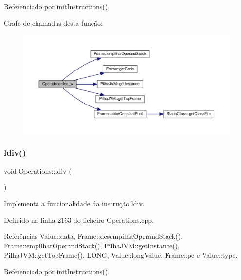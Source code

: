 Referenciado por init\+Instructions().

Grafo de chamadas desta função\+:
\nopagebreak
\begin{figure}[H]
\begin{center}
\leavevmode
\includegraphics[width=350pt]{classOperations_a081fd22827f77e8ce5219275256cc831_cgraph}
\end{center}
\end{figure}
\mbox{\label{classOperations_ab9bb90a9db0433e1d04b0eb9bceea9f4}} 
\subsubsection{\texorpdfstring{ldiv()}{ldiv()}}
{\footnotesize\ttfamily void Operations\+::ldiv (\begin{DoxyParamCaption}{ }\end{DoxyParamCaption})\hspace{0.3cm}{\ttfamily [private]}}



Implementa a funcionalidade da instrução ldiv. 



Definido na linha 2163 do ficheiro Operations.\+cpp.



Referências Value\+::data, Frame\+::desempilha\+Operand\+Stack(), Frame\+::empilhar\+Operand\+Stack(), Pilha\+J\+V\+M\+::get\+Instance(), Pilha\+J\+V\+M\+::get\+Top\+Frame(), L\+O\+NG, Value\+::long\+Value, Frame\+::pc e Value\+::type.



Referenciado por init\+Instructions().

